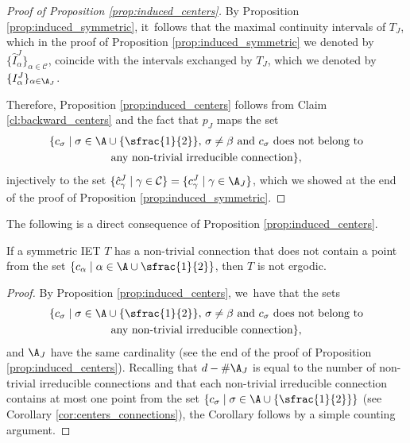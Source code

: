 \begin{proof}[Proof of Proposition \ref{prop:induced_centers}]
By Proposition \ref{prop:induced_symmetric}, it~follows that the maximal continuity intervals of $T_J$, which in the proof of Proposition \ref{prop:induced_symmetric} we denoted by $\{\hat I^J_{\alpha}\}_{\alpha\in\mathcal C}$, coincide with the intervals exchanged by $T_J$, which we denoted by $\{I^J_{\alpha}\}_{\alpha\in\mathcal \A_J}$.

Therefore, Proposition \ref{prop:induced_centers} follows from Claim \ref{cl:backward_centers} and the fact that $p_J$ maps the set
\begin{multline*}
\{c _\sigma \mid \sigma \in \A \cup \{\sfrac{1}{2}\},\, \sigma \neq \beta \text{ and } c_\sigma \text{ does not belong to}\\
\text{any non-trivial irreducible connection}\},
\end{multline*}
injectively to the set $\{\hat c_\gamma^J \mid \gamma \in \mathcal C\} = \{c_\gamma^J \mid \gamma \in \mathcal \A_J\}$, which we showed at the end of the proof of Proposition \ref{prop:induced_symmetric}.
\end{proof}

The following is a direct consequence of Proposition \ref{prop:induced_centers}.

\begin{corollary}\label{cor: emptyconnection}
If a symmetric IET $T$ has a non-trivial connection that does not contain a point from the set $\{c_{\alpha} \mid \alpha \in \A \cup \sfrac{1}{2}\}$, then $T$ is not ergodic.
\end{corollary}
{

\begin{proof} By Proposition \ref{prop:induced_centers}, we~have that the sets
\begin{multline*}
\{c _\sigma \mid \sigma \in \A \cup \{\sfrac{1}{2}\},\, \sigma \neq \beta \text{ and } c_\sigma \text{ does not belong to}\\
\text{any non-trivial irreducible connection}\},
\end{multline*}
and $\A_J$
have the same cardinality (see the end of the proof of Proposition \ref{prop:induced_centers}). Recalling that $d-\#\A_J$ is equal to the number of non-trivial irreducible connections and that each non-trivial irreducible connection contains at most one point from the set $\{c _\sigma \mid \sigma \in \A \cup \{\sfrac{1}{2}\}\} $ (see Corollary \ref{cor:centers_connections}), the Corollary follows by a simple counting argument.
\end{proof}}
